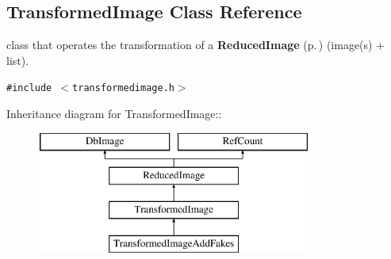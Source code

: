 \subsection{Transformed\-Image  Class Reference}
\label{class_transformedimage}
class that operates the transformation of a {\bf Reduced\-Image} {\rm (p.\,\pageref{class_reducedimage})} (image(s) + list). 


{\tt \#include $<$transformedimage.h$>$}

Inheritance diagram for Transformed\-Image::\begin{figure}[H]
\begin{center}
\leavevmode
\includegraphics[height=4cm]{class_transformedimage}
\end{center}
\end{figure}
